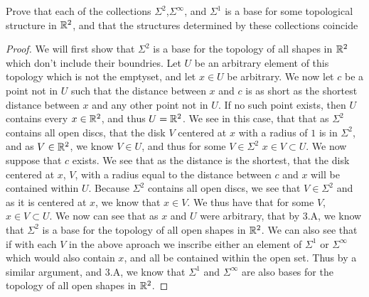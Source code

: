 \begin{minorEx}%
  Prove that each of the collections $\Sigma^2$,$\Sigma^\infty$, and
  $\Sigma^1$ is a base for some topological structure in $\mathbb{R}^2$, and
  that the structures determined by these collections coincide
\end{minorEx}
\begin{proof}
  We will first show that $\Sigma^2$ is a base for the topology of all
  shapes in $\mathbb{R}^2$ which don't include their boundries. Let $U$ be an
  arbitrary element of this topology which is not the emptyset, and
  let $x\in U$ be arbitrary. We now let $c$ be a point not in $U$ such
  that the distance between $x$ and $c$ is as short as the shortest
  distance between $x$ and any other point not in $U$. If no such
  point exists, then $U$ contains every $x\in\mathbb{R}^2$, and thus $U =
  \mathbb{R}^2$. We see in this case, that that as $\Sigma^2$ contains all open
  discs, that the disk $V$ centered at $x$ with a radius of $1$ is in
  $\Sigma^2$, and as $V\in \mathbb{R}^2$, we know $V \in U$, and thus for
  some $V\in \Sigma^2$  $x\in V \subset U$. We now suppose that $c$
  exists. We see that as the distance is the shortest, that the disk
  centered at $x$, $V$, with a radius equal to the distance between $c$ and
  $x$ will be contained within $U$. Because $\Sigma^2$ contains all open
  discs, we see that $V\in\Sigma^2$ and as it is centered at $x$, we
  know that $x \in V$. We thus have that for some $V$, $x\in V \subset
  U$. We now can see that as $x$ and $U$ were arbitrary, that by 3.A,
  we know that $\Sigma^2$ is a base for the topology of all open
  shapes in $\mathbb{R}^2$. We can also see that if with each $V$ in the
  above aproach we inscribe either an element of $\Sigma^1$ or
  $\Sigma^\infty$ which would also contain $x$, and all be contained
  within the open set. Thus by a similar argument, and 3.A, we know
  that $\Sigma^1$ and $\Sigma^\infty$ are also bases for the topology of all open
  shapes in $\mathbb{R}^2$.

\end{proof}
